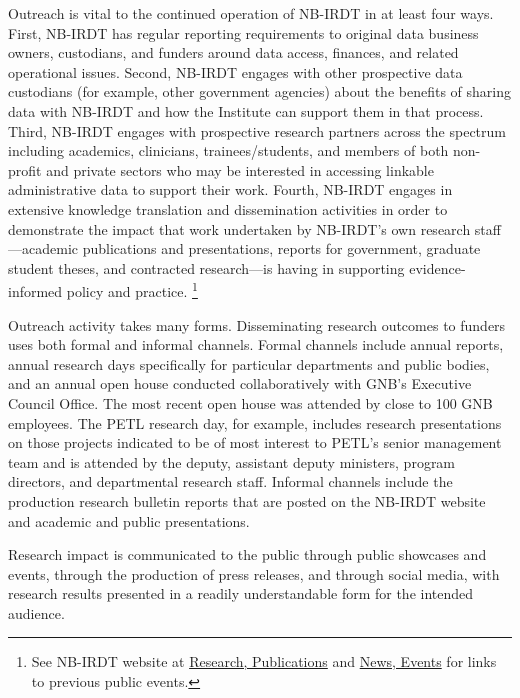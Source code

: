 \documentclass[
]{WileySix}
\begin{document}
Outreach is vital to the continued operation of NB-IRDT in at least four ways. First, NB-IRDT has regular reporting requirements to original data business owners, custodians, and funders around data access, finances, and related operational issues. Second, NB-IRDT engages with other prospective data custodians (for example, other government agencies) about the benefits of sharing data with NB-IRDT and how the Institute can support them in that process. Third, NB-IRDT engages with prospective research partners across the spectrum including academics, clinicians, trainees/students, and members of both non-profit and private sectors who may be interested in accessing linkable administrative data to support their work. Fourth, NB-IRDT engages in extensive knowledge translation and dissemination activities in order to demonstrate the impact that work undertaken by NB-IRDT's own research staff---academic publications and presentations, reports for government, graduate student theses, and contracted research---is having in supporting evidence-informed policy and practice. \footnote{See NB-IRDT website at \href{https://www.nbirdt.ca/publications}{Research, Publications} and \href{https://www.nbirdt.ca/nbirdt-events}{News, Events} for links to previous public events.}

Outreach activity takes many forms. Disseminating research outcomes to funders uses both formal and informal channels. Formal channels include annual reports, annual research days specifically for particular departments and public bodies, and an annual open house conducted collaboratively with GNB's Executive Council Office. The most recent open house was attended by close to 100 GNB employees. The PETL research day, for example, includes research presentations on those projects indicated to be of most interest to PETL's senior management team and is attended by the deputy, assistant deputy ministers, program directors, and departmental research staff. Informal channels include the production research bulletin reports that are posted on the NB-IRDT website and academic and public presentations.

Research impact is communicated to the public through public showcases and events, through the production of press releases, and through social media, with research results presented in a readily understandable form for the intended audience.
\end{document}
